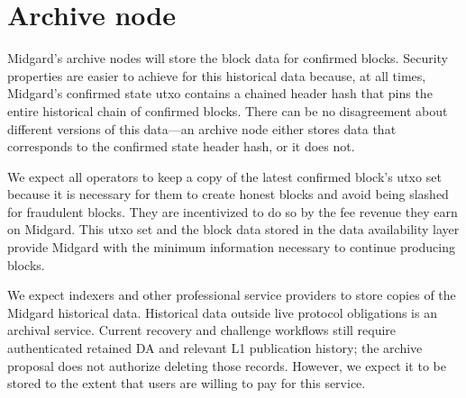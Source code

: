 \documentclass[../midgard.tex]{subfiles}
\begin{document}
\section{Archive node}
\label{h:archive-node}

Midgard's archive nodes will store the block data for confirmed blocks.
Security properties are easier to achieve for this historical data because, at all times, Midgard's confirmed state utxo contains a chained header hash that pins the entire historical chain of confirmed blocks.
There can be no disagreement about different versions of this data---an archive node either stores data that corresponds to the confirmed state header hash, or it does not.

We expect all operators to keep a copy of the latest confirmed block's utxo set because it is necessary for them to create honest blocks and avoid being slashed for fraudulent blocks.
They are incentivized to do so by the fee revenue they earn on Midgard.
This utxo set and the block data stored in the data availability layer provide Midgard with the minimum information necessary to continue producing blocks.

We expect indexers and other professional service providers to store copies of the Midgard historical data.
Historical data outside live protocol obligations is an archival service. Current recovery and challenge workflows still require authenticated retained DA and relevant L1 publication history; the archive proposal does not authorize deleting those records. However, we expect it to be stored to the extent that users are willing to pay for this service.
\end{document}
